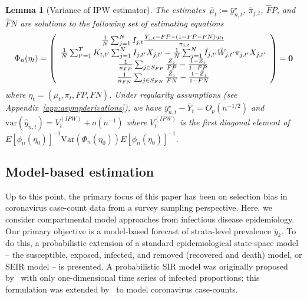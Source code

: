 \documentclass[11pt]{amsart}
\numberwithin{equation}{section}
\theoremstyle{plain}
\newtheorem{lemma}[theorem]{Lemma}
\begin{document}
\begin{lemma}[Variance of IPW estimator] \normalfont
\label{lemma:ipw}
The estimates~$\hat \mu_t := \bar y_{n,t}^\star$, $\hat \pi_{j,t}$, $\hat FP$, and $\hat FN$ are solutions to the following set of estimating equations
$$
\Phi_n (\eta_t) =
\left (
\begin{array}{c}
\frac{1}{N} \sum_{j=1}^N I_{j,t} \frac{Y_{j,t} - FP - (1-FP-FN) \cdot \mu_t}{\pi_{j,t}} \\
\frac{1}{N} \sum_{t^\prime = 1}^T K_{t,t^\prime} \sum_{j=1}^N I_{j,t^\prime} X_{j,t^\prime} - \frac{1}{N} \sum_{j = 1}^N \tilde I_{j,t^\prime} \tilde W_{j,t^\prime}  \pi_{j,t^\prime} X_{j,t^\prime}  \\
\frac{1}{n_{FP}} \sum_{j \in S_{FP}} \frac{Z_j}{FP} - \frac{1-Z_j}{1-FP} \\
\frac{1}{n_{FN}} \sum_{j \in S_{FN}} \frac{\tilde Z_j}{FN} - \frac{1-\tilde Z_j}{1-FN} \\
\end{array}
\right ) = {\bf 0}
$$
where $\eta_t = (\mu_t, \pi_t, FP, FN)$. Under regularity assumptions (see Appendix~\ref{app:asympderivations}), we have $\bar y_{n,t}^\star - \bar Y_{t} = O_p (n^{-1/2})$  and $\text{var} (\hat y_{n,t}) = V_{t}^{(IPW)} + o (n^{-1})$ where $V_t^{(IPW)}$ is the first diagonal element of $E [\phi_n(\eta_0)]^{-1} \text{Var}(\Phi_n(\eta_0))E [\phi_n(\eta_0)]^{-1}$.
\end{lemma}

\subsection{Model-based estimation}
\label{section:modelbased}

Up to this point, the primary focus of this paper has been on selection bias in coronavirus case-count data from a survey sampling perspective.  Here, we consider compartmental model approaches from infectious disease epidemiology.  Our primary objective is a model-based forecast of strata-level prevalence $\bar y_k$. To do this, a probabilistic extension of a standard epidemiological state-space model -- the susceptible, exposed, infected, and removed (recovered and death) model, or SEIR model -- is presented. A probabilistic SIR model was originally proposed by~\cite{Osthus2017} with only one-dimensional time series of infected proportions; this formulation was extended by~\cite{Song2020} to model coronavirus case-counts.
\end{document}
